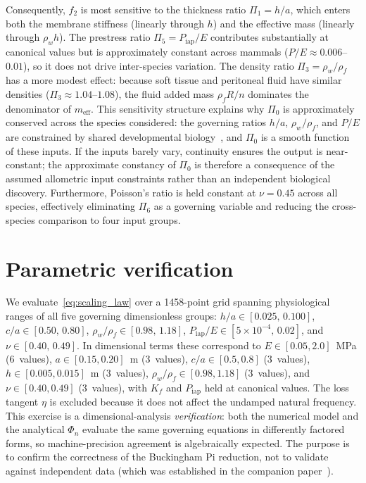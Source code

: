 \documentclass[review]{elsarticle}
\begin{document}
Consequently, $f_2$ is most sensitive to the thickness ratio $\Pi_1 = h/a$,
which enters both the membrane stiffness (linearly through $h$) and the
effective mass (linearly through $\rho_w h$).  The prestress ratio $\Pi_5 =
P_\mathrm{iap}/E$ contributes substantially at canonical values but is
approximately constant across mammals ($P/E \approx 0.006$--$0.01$),
so it does not drive inter-species variation.  The density ratio $\Pi_3 =
\rho_w/\rho_f$ has a more modest effect: because soft tissue and
peritoneal fluid have similar densities ($\Pi_3 \approx 1.04$--$1.08$), the
fluid added mass $\rho_f R / n$ dominates the denominator of
$m_\mathrm{eff}$.
This sensitivity structure explains why $\Pi_0$ is approximately conserved
across the species considered: the governing ratios $h/a$, $\rho_w/\rho_f$,
and $P/E$ are constrained by shared developmental
biology~\cite{West1997}, and $\Pi_0$ is a smooth function of these inputs.
If the inputs barely vary, continuity ensures the output is near-constant;
the approximate constancy of $\Pi_0$ is therefore a consequence of the
assumed allometric input constraints rather than an independent biological
discovery.  Furthermore, Poisson's ratio is held constant at $\nu = 0.45$
across all species, effectively eliminating $\Pi_6$ as a governing variable
and reducing the cross-species comparison to four input groups.

\section{Parametric verification}
\label{sec:results}

We evaluate~\eqref{eq:scaling_law} over a 1458-point grid spanning
physiological ranges of all five governing dimensionless groups:
$h/a \in [0.025,\, 0.100]$,
$c/a \in [0.50,\, 0.80]$,
$\rho_w/\rho_f \in [0.98,\, 1.18]$,
$P_\mathrm{iap}/E \in [5 \times 10^{-4},\, 0.02]$,
and $\nu \in [0.40,\, 0.49]$.
In dimensional terms these correspond to
$E \in [0.05, 2.0]$~MPa (6~values),
$a \in [0.15, 0.20]$~m (3~values), $c/a \in [0.5, 0.8]$ (3~values),
$h \in [0.005, 0.015]$~m (3~values), $\rho_w/\rho_f \in [0.98, 1.18]$
(3~values), and $\nu \in [0.40, 0.49]$ (3~values), with $K_f$ and
$P_\mathrm{iap}$ held at canonical values.  The loss tangent $\eta$
is excluded because it does not affect the undamped natural frequency.
This exercise is a dimensional-analysis \emph{verification}: both the
numerical model and the analytical $\Phi_n$ evaluate the same governing
equations in differently factored forms, so machine-precision agreement
is algebraically expected.  The purpose is to confirm the correctness
of the Buckingham Pi reduction, not to validate against independent data
(which was established in the companion paper~\cite{Mace2026browntone}).
\end{document}

